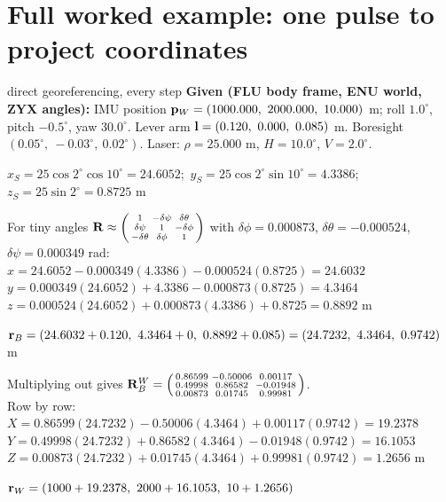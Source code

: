 \section{Full worked example: one pulse to project coordinates}
\begin{worked}{direct georeferencing, every step}
\textbf{Given (FLU body frame, ENU world, ZYX angles):}
IMU position $\mathbf{p}_W=(1000.000,\ 2000.000,\ 10.000)$ m; roll $1.0^\circ$, pitch $-0.5^\circ$, yaw $30.0^\circ$. Lever arm $\vect l=(0.120,\ 0.000,\ 0.085)$ m. Boresight $(0.05^\circ,\ -0.03^\circ,\ 0.02^\circ)$. Laser: $\rho=25.000$ m, $H=10.0^\circ$, $V=2.0^\circ$.

$x_S=25\cos2^\circ\cos10^\circ=24.6052$;\ $y_S=25\cos2^\circ\sin10^\circ=4.3386$;\ $z_S=25\sin2^\circ=0.8725$ m

For tiny angles $\mathbf{R}\approx\begin{psmallmatrix}1&-\delta\psi&\delta\theta\\\delta\psi&1&-\delta\phi\\-\delta\theta&\delta\phi&1\end{psmallmatrix}$ with $\delta\phi=0.000873$, $\delta\theta=-0.000524$, $\delta\psi=0.000349$ rad:\\
$x=24.6052-0.000349(4.3386)-0.000524(0.8725)=24.6032$\\
$y=0.000349(24.6052)+4.3386-0.000873(0.8725)=4.3464$\\
$z=0.000524(24.6052)+0.000873(4.3386)+0.8725=0.8892$ m

$\vect r_B=(24.6032+0.120,\ 4.3464+0,\ 0.8892+0.085)=(24.7232,\ 4.3464,\ 0.9742)$ m

Multiplying out gives
$\mathbf{R}^W_B=\begin{psmallmatrix}0.86599&-0.50006&0.00117\\0.49998&0.86582&-0.01948\\0.00873&0.01745&0.99981\end{psmallmatrix}$.\\
Row by row: $X=0.86599(24.7232)-0.50006(4.3464)+0.00117(0.9742)=19.2378$\\
$Y=0.49998(24.7232)+0.86582(4.3464)-0.01948(0.9742)=16.1053$\\
$Z=0.00873(24.7232)+0.01745(4.3464)+0.99981(0.9742)=1.2656$ m

$\vect r_W=(1000+19.2378,\ 2000+16.1053,\ 10+1.2656)$
\end{worked}

